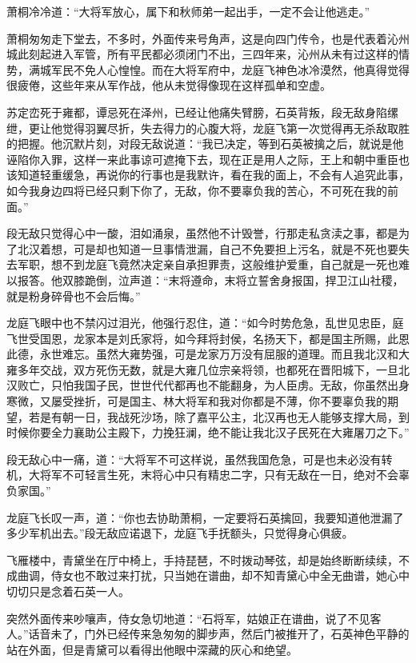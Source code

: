 萧桐冷冷道：“大将军放心，属下和秋师弟一起出手，一定不会让他逃走。”

萧桐匆匆走下堂去，不多时，外面传来号角声，这是向四门传令，也是代表着沁州城此刻起进入军管，所有平民都必须闭门不出，三四年来，沁州从未有过这样的情势，满城军民不免人心惶惶。而在大将军府中，龙庭飞神色冰冷漠然，他真得觉得很疲倦，这些年来从军作战，他从未觉得像现在这样孤单和空虚。

苏定峦死于雍都，谭忌死在泽州，已经让他痛失臂膀，石英背叛，段无敌身陷缧绁，更让他觉得羽翼尽折，失去得力的心腹大将，龙庭飞第一次觉得再无杀敌取胜的把握。他沉默片刻，对段无敌说道：“我已决定，等到石英被擒之后，就说是他诬陷你入罪，这样一来此事谅可遮掩下去，现在正是用人之际，王上和朝中重臣也该知道轻重缓急，再说你的行事也是我默许，看在我的面上，不会有人追究此事，如今我身边四将已经只剩下你了，无敌，你不要辜负我的苦心，不可死在我的前面。”

段无敌只觉得心中一酸，泪如涌泉，虽然他不计毁誉，行那走私贪渎之事，都是为了北汉着想，可是却也知道一旦事情泄漏，自己不免要担上污名，就是不死也要失去军职，想不到龙庭飞竟然决定亲自承担罪责，这般维护爱重，自己就是一死也难以报答。他双膝跪倒，泣声道：“末将遵命，末将立誓舍身报国，捍卫江山社稷，就是粉身碎骨也不会后悔。”

龙庭飞眼中也不禁闪过泪光，他强行忍住，道：“如今时势危急，乱世见忠臣，庭飞世受国恩，龙家本是刘氏家将，如今拜将封侯，名扬天下，都是国主所赐，此恩此德，永世难忘。虽然大雍势强，可是龙家万万没有屈服的道理。而且我北汉和大雍多年交战，双方死伤无数，就是大雍几位宗亲将领，也都死在晋阳城下，一旦北汉败亡，只怕我国子民，世世代代都再也不能翻身，为人臣虏。无敌，你虽然出身寒微，又屡受挫折，可是国主、林大将军和我对你都是不薄，你不要辜负我的期望，若是有朝一日，我战死沙场，除了嘉平公主，北汉再也无人能够支撑大局，到时候你要全力襄助公主殿下，力挽狂澜，绝不能让我北汉子民死在大雍屠刀之下。”

段无敌心中一痛，道：“大将军不可这样说，虽然我国危急，可是也未必没有转机，大将军不可轻言生死，末将心中只有精忠二字，只有无敌在一日，绝对不会辜负家国。”

龙庭飞长叹一声，道：“你也去协助萧桐，一定要将石英擒回，我要知道他泄漏了多少军机出去。”段无敌应诺退下，龙庭飞手抚额头，只觉得身心俱疲。

飞雁楼中，青黛坐在厅中椅上，手持琵琶，不时拨动琴弦，却是始终断断续续，不成曲调，侍女也不敢过来打扰，只当她在谱曲，却不知青黛心中全无曲谱，她心中切切只是念着石英一人。

突然外面传来吵嚷声，侍女急切地道：“石将军，姑娘正在谱曲，说了不见客人。”话音未了，门外已经传来急匆匆的脚步声，然后门被推开了，石英神色平静的站在外面，但是青黛可以看得出他眼中深藏的灰心和绝望。

